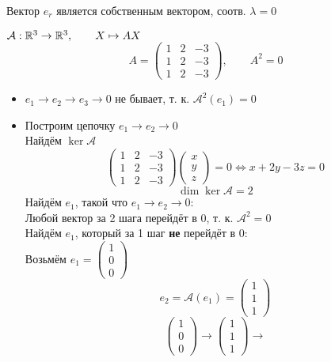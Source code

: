 \begin{remark}
	Вектор $ e_r $ является собственным вектором, соотв. $ \lambda = 0 $
\end{remark}

\begin{eg}
	$ \mathcal{A} : \mathbb{R}^3 \to \mathbb{R}^3, \qquad X \mapsto AX $
	$$ A =
	\begin{pmatrix}
		1 & 2 & -3 \\
		1 & 2 & -3 \\
		1 & 2 & -3
	\end{pmatrix}, \qquad A^2 = 0 $$
	\begin{itemize}
		\item $ e_1 \to e_2 \to e_3 \to 0 $ не бывает, т. к. $ \mathcal{A}^2(e_1) = 0 $
		\item Построим цепочку $ e_1 \to e_2 \to 0 $ \\
		Найдём $ \ker \mathcal{A} $
		$$
		\begin{pmatrix}
		1 & 2 & -3 \\
		1 & 2 & -3 \\
		1 & 2 & -3
	\end{pmatrix}
	\begin{pmatrix}
		x \\
		y \\
		z
	\end{pmatrix} = 0 \iff x + 2y - 3z = 0 $$
	$$ \dim \ker \mathcal{A} = 2 $$
	Найдём $ e_1 $, такой что $ e_1 \to e_2 \to 0 $: \\
	Любой вектор за 2 шага перейдёт в 0, т. к. $ \mathcal{A}^2 = 0 $ \\
	Найдём $ e_1 $, который за 1 шаг \textbf{не} перейдёт в 0: \\
	Возьмём $ e_1 =
	\begin{pmatrix}
		1 \\
		0 \\
		0
	\end{pmatrix} $
	$$ e_2 = \mathcal{A}(e_1) =
	\begin{pmatrix}
		1 \\
		1 \\
		1
	\end{pmatrix} $$
	$$
	\begin{pmatrix}
		1 \\
		0 \\
		0
	\end{pmatrix} \to
	\begin{pmatrix}
		1 \\
		1 \\
		1
	\end{pmatrix} \to
$$
\end{itemize}
\end{eg}
